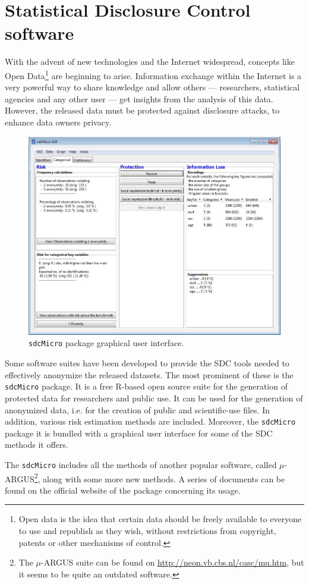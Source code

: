 \section{Statistical Disclosure Control software}
\label{State::SDC}

With the advent of new technologies and the Internet widespread, concepts like Open Data\footnote{Open data is the idea that certain data should be freely available to everyone to use and republish as they wish, without restrictions from copyright, patents or other mechanisms of control.} are beginning to arise. Information exchange within the Internet is a very powerful way to share knowledge and allow others --- researchers, statistical agencies and any other user --- get insights from the analysis of this data. However, the released data must be protected against disclosure attacks, to enhance data owners privacy.

\begin{figure}[ht]
\centering
\includegraphics[width=0.7\linewidth]{figures/sdcMicroScreenshot.jpg}
\caption[\texttt{sdcMicro} Graphical User Interface.]{\texttt{sdcMicro} package graphical user interface.}
\label{fig:sdcMicro-gui}
\end{figure}

Some software suites have been developed to provide the SDC tools needed to effectively anonymize the released datasets. The most prominent of these is the \texttt{sdcMicro} package. It is a free R-based open source suite for the generation of protected data for researchers and public use. It can be used for the generation of anonymized data, i.e. for the creation of public and scientific-use files. In addition, various risk estimation methods are included. Moreover, the \texttt{sdcMicro} package it is bundled with a graphical user interface for some of the SDC methods it offers.

The \texttt{sdcMicro} includes all the methods of another popular software, called $\mu$-ARGUS\footnote{The $\mu$-ARGUS suite can be found on \url{http://neon.vb.cbs.nl/casc/mu.htm}, but it seems to be quite an outdated software.}, along with some more new methods. A series of documents can be found on the official website of the package concerning its usage.